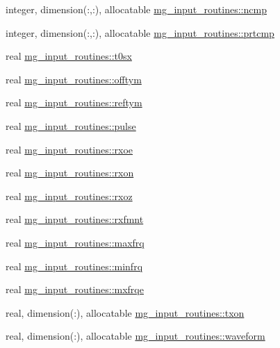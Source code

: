\begin{DoxyCompactItemize}
\item 
integer, dimension(\+:,\+:), allocatable \hyperlink{namespacemg__input__routines_a22d278bfaca850a0ab774373e78661ec}{mg\+\_\+input\+\_\+routines\+::ncmp}
\item 
integer, dimension(\+:,\+:), allocatable \hyperlink{namespacemg__input__routines_a2d4f6b1d77d6d39073787c5ef8610846}{mg\+\_\+input\+\_\+routines\+::prtcmp}
\item 
real \hyperlink{namespacemg__input__routines_aba5372049608986433b213c29131ae76}{mg\+\_\+input\+\_\+routines\+::t0sx}
\item 
real \hyperlink{namespacemg__input__routines_ae941a66d7f6ae56bb10804012c7ea83d}{mg\+\_\+input\+\_\+routines\+::offtym}
\item 
real \hyperlink{namespacemg__input__routines_a356426671d63fb59083bb2889f3ce32d}{mg\+\_\+input\+\_\+routines\+::reftym}
\item 
real \hyperlink{namespacemg__input__routines_afd964e2708e277d0de51b48b4d63bb2c}{mg\+\_\+input\+\_\+routines\+::pulse}
\item 
real \hyperlink{namespacemg__input__routines_a643bde30769902c6e7548b67f8e3d757}{mg\+\_\+input\+\_\+routines\+::rxoe}
\item 
real \hyperlink{namespacemg__input__routines_aac35589daa373684efc6c14b17bc0982}{mg\+\_\+input\+\_\+routines\+::rxon}
\item 
real \hyperlink{namespacemg__input__routines_a9bff6494d3f3462d52b9610d0fd487a8}{mg\+\_\+input\+\_\+routines\+::rxoz}
\item 
real \hyperlink{namespacemg__input__routines_ac04bfd59cec92c926f5c20864cb615ad}{mg\+\_\+input\+\_\+routines\+::rxfmnt}
\item 
real \hyperlink{namespacemg__input__routines_a9c6fc602bbc9b8c29310af346d80ad74}{mg\+\_\+input\+\_\+routines\+::maxfrq}
\item 
real \hyperlink{namespacemg__input__routines_a0c365e2dbdbd75369df81405c3e5667f}{mg\+\_\+input\+\_\+routines\+::minfrq}
\item 
real \hyperlink{namespacemg__input__routines_a0af8fff8410098941c2a2c06279fad18}{mg\+\_\+input\+\_\+routines\+::mxfrqe}
\item 
real, dimension(\+:), allocatable \hyperlink{namespacemg__input__routines_ade148d83ae4d8481d6083be159888b3e}{mg\+\_\+input\+\_\+routines\+::txon}
\item 
real, dimension(\+:), allocatable \hyperlink{namespacemg__input__routines_ad7cf9f6ffae9fd91b7d6d29ffada4978}{mg\+\_\+input\+\_\+routines\+::waveform}

\end{DoxyCompactItemize}
